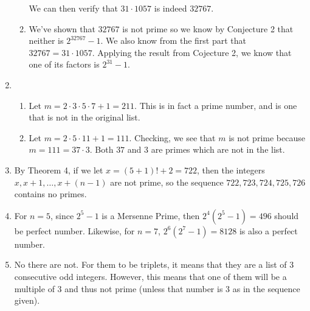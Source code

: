 \documentclass{article}
\begin{document}
\begin{enumerate}
\begin{enumerate}
    We can then verify that $31 \cdot 1057$ is indeed $32767$.
\item We've shown that $32767$ is not prime so we know by Conjecture 2 that neither is $2^{32767} - 1$.  We also know from the first part that $32767=31 \cdot 1057$.  Applying the result from Cojecture 2, we know that one of its factors is $2^{31} - 1$.
  \end{enumerate}
\item
  \begin{enumerate}
  \item Let $m = 2 \cdot 3 \cdot 5 \cdot 7 + 1 = 211$.  This is in fact a prime number, and is one that is not in the original list.
  \item Let $m = 2 \cdot 5 \cdot 11 + 1 = 111$.  Checking, we see that $m$ is not prime because $m=111=37 \cdot 3$.  Both $37$ and $3$ are primes which are not in the list.
  \end{enumerate}
\item By Theorem 4, if we let $x=(5+1)!+2=722$, then the integers $x,x+1,\ldots,x+(n-1)$ are not prime, so the sequence $722, 723, 724, 725, 726$ contains no primes.
\item For $n=5$, since $2^5 - 1$ is a Mersenne Prime, then $2^4(2^5 - 1)=496$ should be perfect number.  Likewise, for $n=7$, $2^6(2^7-1)=8128$ is also a perfect number.
\item No there are not.  For them to be triplets, it means that they are a list of 3 consecutive odd integers.  However, this means that one of them will be a multiple of 3 and thus not prime (unless that number is $3$ as in the sequence given).
\end{enumerate}
\end{document}
